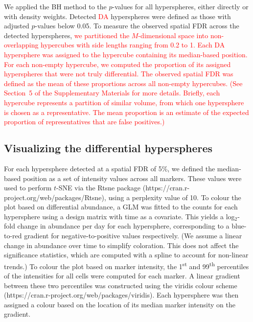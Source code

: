 \documentclass{article}
\newcommand\revised[1]{\textcolor{red}{#1}}
\newcommand{\suppfdr}{5}
\newcommand{\suppfigfdr}{8}
\begin{document}
We applied the BH method to the $p$-values for all hyperspheres, either directly or with density weights.
Detected \revised{DA} hyperspheres were defined as those with adjusted $p$-values below 0.05.
To measure the observed spatial FDR across the detected hyperspheres, \revised{we partitioned the $M$-dimensional space into non-overlapping hypercubes with side lengths ranging from 0.2 to 1.
Each DA hypersphere was assigned to the hypercube containing its median-based position.
For each non-empty hypercube, we computed the proportion of its assigned hyperspheres that were not truly differential.
The observed spatial FDR was defined as the mean of these proportions across all non-empty hypercubes.
(See Section~\suppfdr{} of the Supplementary Materials for more details.
Briefly, each hypercube represents a partition of similar volume, from which one hypersphere is chosen as a representative.
The mean proportion is an estimate of the expected proportion of representatives that are false positives.)}


\subsection{Visualizing the differential hyperspheres}
For each hypersphere detected at a spatial FDR of 5\%, we defined the median-based position as a set of intensity values across all markers.
These values were used to perform $t$-SNE via the Rtsne package (https://cran.r-project.org/web/packages/Rtsne), using a perplexity value of 10.
To colour the plot based on differential abundance, a GLM was fitted to the counts for each hypersphere using a design matrix with time as a covariate.
This yields a log$_2$-fold change in abundance per day for each hypersphere, corresponding to a blue-to-red gradient for negative-to-positive values respectively.
(We assume a linear change in abundance over time to simplify coloration.
This does not affect the significance statistics, which are computed with a spline to account for non-linear trends.)
To colour the plot based on marker intensity, the 1\textsuperscript{st} and 99\textsuperscript{th} percentiles of the intensities for all cells were computed for each marker.
A linear gradient between these two percentiles was constructed using the viridis colour scheme (https://cran.r-project.org/web/packages/viridis).
Each hypersphere was then assigned a colour based on the location of its median marker intensity on the gradient. 
\end{document}
